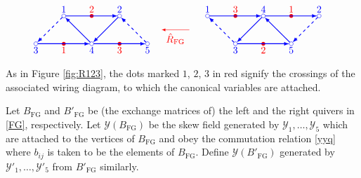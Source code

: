 \documentclass[pdftex]{sigma}
\newcommand\qarrow[2]{\draw[->,shorten >=2pt,shorten <=2pt] (#1) -- (#2) [thick];} %
\newcommand\qdarrow[2]{\draw[->,dashed,shorten >=2pt,shorten <=2pt] (#1) -- (#2) [thick];} %
\numberwithin{equation}{section}
\begin{document}
\begin{align}
\label{FG}
\begin{split}&
\begin{tikzpicture}
\begin{scope}[>=latex,xshift=0pt]
{\color{red}
\fill (1,0.5) circle(2pt) coordinate(A) node[below]{$1$};
\fill (2,1.5) circle(2pt) coordinate(B) node[above]{$2$};
\fill (3,0.5) circle(2pt) coordinate(C) node[below]{$3$};
}
%
\coordinate (P1) at (4.5,1);
\coordinate (P2) at (5.5,1);
{\color{red}
\draw[<-] (4.5,1) -- (5.5,1);
\draw (5,1) circle(0pt) node[below]{$\hat{R}_\mathrm{FG}$};
}
%
{\color{blue}
\draw (0,0.5) circle(2pt) coordinate(B1) node[below]{$3$};
\draw (2,0.5) circle(2pt) coordinate(C1) node[below]{$4$};
\draw (4,0.5) circle(2pt) coordinate(F1) node[below]{$5$};
\draw (1,1.5) circle(2pt) coordinate(D1) node[above]{$1$};
\draw (3,1.5) circle(2pt) coordinate(E1) node[above]{$2$};
\qarrow{B1}{C1}
\qarrow{C1}{D1}
\qarrow{D1}{E1}
\qarrow{E1}{C1}
\qarrow{C1}{F1}
\qdarrow{D1}{B1}
\qdarrow{F1}{E1}
}
\end{scope}
%
\begin{scope}[>=latex,xshift=175pt]
{\color{red}
\fill (3,1.5) circle(2pt) coordinate(A) node[above]{$1$};
\fill (2,0.5) circle(2pt) coordinate(B) node[below]{$2$};
\fill (1,1.5) circle(2pt) coordinate(C) node[above]{$3$};
}
%
%
{\color{blue}
\draw (0,1.5) circle(2pt) coordinate(B1) node[above]{$1$};%
\draw (2,1.5) circle(2pt) coordinate(C1) node[above]{$4$};%
\draw (4,1.5) circle(2pt) coordinate(D1) node[above]{$2$};%
\draw (1,0.5) circle(2pt) coordinate(E1) node[below]{$3$};%
\draw (3,0.5) circle(2pt) coordinate(F1) node[below]{$5$};%
\qarrow{B1}{C1}
\qarrow{C1}{D1}
\qarrow{E1}{F1}
\qarrow{F1}{C1}
\qarrow{C1}{E1}
\qdarrow{E1}{B1}
\qdarrow{D1}{F1}
}
\end{scope}
\end{tikzpicture}
\end{split}
\end{align}
As in Figure \ref{fig:R123}, the dots marked $1$, $2$, $3$ in red
signify the crossings of the associated wiring diagram, to which the
canonical variables are attached.

Let $B_{\mathrm{FG}}$ and $B'_{\mathrm{FG}}$ be (the exchange matrices
of) the left and the right quivers in \eqref{FG}, respectively. Let
$\mathcal{Y}(B_{\mathrm{FG}})$ be the skew field generated by
$\mathscr{Y}_1, \dots, \mathscr{Y}_5$ which are attached to the
vertices of $B_{\mathrm{FG}}$ and obey the commutation relation
\eqref{yyq} where $b_{ij}$ is taken to be the elements of
$B_{\mathrm{FG}}$. Define $\mathcal{Y}(B'_{\mathrm{FG}})$ generated
by $\mathscr{Y}'_1, \dots, \mathscr{Y}'_5$ from $B'_{\mathrm{FG}}$
similarly.
\end{document}
